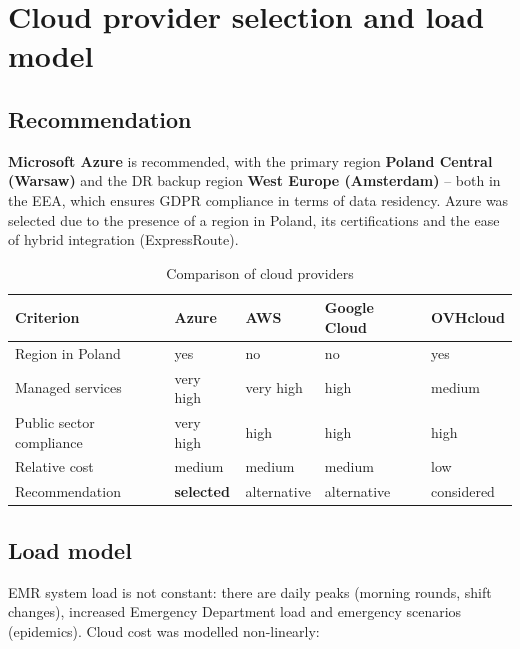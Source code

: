 \section{Cloud provider selection and load model}

\subsection{Recommendation}

\textbf{Microsoft Azure} is recommended, with the primary region \textbf{Poland Central (Warsaw)} and the DR backup region \textbf{West Europe (Amsterdam)} -- both in the EEA, which ensures GDPR compliance in terms of data residency. Azure was selected due to the presence of a region in Poland, its certifications and the ease of hybrid integration (ExpressRoute).

\begin{table}[h]
\centering
\small
\renewcommand{\arraystretch}{1.2}
\begin{tabular}{|L{3.4cm}|C{2.4cm}|C{2.4cm}|C{2.4cm}|C{2.4cm}|}
\hline
{}\textbf{Criterion} & \textbf{Azure} & \textbf{AWS} & \textbf{Google Cloud} & \textbf{OVHcloud} \\
\hline
Region in Poland & yes & no & no & yes \\
\hline
Managed services & very high & very high & high & medium \\
\hline
Public sector compliance & very high & high & high & high \\
\hline
Relative cost & medium & medium & medium & low \\
\hline
Recommendation & \textbf{selected} & alternative & alternative & considered \\
\hline
\end{tabular}
\caption{Comparison of cloud providers}
\label{tab:chmura}
\end{table}

\subsection{Load model}

EMR system load is not constant: there are daily peaks (morning rounds, shift changes), increased Emergency Department load and emergency scenarios (epidemics). Cloud cost was modelled non-linearly:

